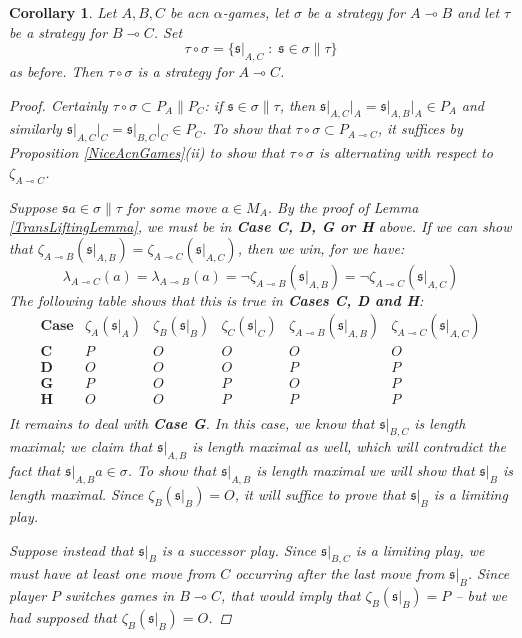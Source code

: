 \documentclass[11pt]{article} %
\theoremstyle{plain} %
\newtheorem{corollary}[theorem]{Corollary}
\theoremstyle{definition} %
\theoremstyle{note}
\theoremstyle{exercisestyle}
\renewcommand{\implies}{\multimap}
\newcommand{\comp}[2]{#1 \circ #2}
\newcommand{\suchthat}{\;\colon\;}
\newcommand{\s}{\mathfrak s}
\begin{document}
\begin{corollary}
  Let $A,B,C$ be acn $\alpha$-games, let $\sigma$ be a strategy for $A\implies B$ and let $\tau$ be a strategy for $B\implies C$.  Set
  \[
    \comp\tau\sigma = \{\s\vert_{A,C}\suchthat\s\in\sigma\|\tau\}
    \]
  as before.  Then $\comp\tau\sigma$ is a strategy for $A\implies C$.

  \begin{proof}
    Certainly $\comp\tau\sigma\subset P_A\|P_C$: if $\s\in\sigma\|\tau$, then $\s\vert_{A,C}\vert_A=\s\vert_{A,B}\vert_A\in P_A$ and similarly $\s\vert_{A,C}\vert_C=\s\vert_{B,C}\vert_C\in P_C$.  To show that $\comp\tau\sigma\subset P_{A\implies C}$, it suffices by Proposition \ref{NiceAcnGames}(ii) to show that $\comp\tau\sigma$ is alternating with respect to $\zeta_{A\implies C}$.

    Suppose $\s a\in\sigma\|\tau$ for some move $a\in M_A$.  By the proof of Lemma \ref{TransLiftingLemma}, we must be in \textbf{Case C, D, G or H} above.  If we can show that $\zeta_{A\implies B}(\s\vert_{A,B})=\zeta_{A\implies C}(\s\vert_{A,C})$, then we win, for we have:
    \[
      \lambda_{A\implies C}(a)=\lambda_{A\implies B}(a) = \neg\zeta_{A\implies B}(\s\vert_{A,B})=\neg\zeta_{A\implies C}(\s\vert_{A,C})
      \]
    The following table shows that this is true in \textbf{Cases C, D and H}:
    \[
      \begin{array}{c|ccc|cc}
        \textbf{Case} & \zeta_A(\s\vert_A) & \zeta_B(\s\vert_B) & \zeta_C(\s\vert_C) & \zeta_{A\implies B}(\s\vert_{A,B}) & \zeta_{A\implies C}(\s\vert_{A,C}) \\
        \hline
        \textbf{C} & P & O & O & O & O \\
        \textbf{D} & O & O & O & P & P \\
        \textbf{G} & P & O & P & O & P \\
        \textbf{H} & O & O & P & P & P \\
      \end{array}
      \]
    It remains to deal with \textbf{Case G}.  In this case, we know that $\s\vert_{B,C}$ is length maximal; we claim that $\s\vert_{A,B}$ is length maximal as well, which will contradict the fact that $\s\vert_{A,B}a\in\sigma$.  To show that $\s\vert_{A,B}$ is length maximal we will show that $\s\vert_B$ is length maximal.  Since $\zeta_B(\s\vert_B)=O$, it will suffice to prove that $\s\vert_B$ is a limiting play.

    Suppose instead that $\s\vert_B$ is a successor play.  Since $\s\vert_{B,C}$ is a limiting play, we must have at least one move from $C$ occurring after the last move from $\s\vert_B$.  Since player $P$ switches games in $B\implies C$, that would imply that $\zeta_B(\s\vert_B)=P$ -- but we had supposed that $\zeta_B(\s\vert_B)=O$.  


\end{proof}
\end{corollary}
\end{document}
